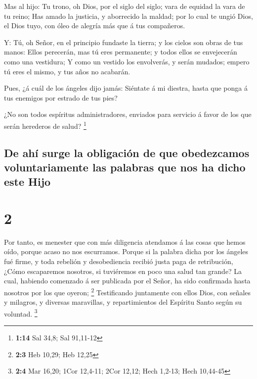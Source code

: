  Mas al hijo: Tu trono, oh Dios, por el siglo del siglo;
vara de equidad la vara de tu reino;  Has amado la
justicia, y aborrecido la maldad; por lo cual te ungió Dios, el Dios
tuyo, con óleo de alegría más que á tus compañeros.

 Y: Tú, oh Señor, en el principio fundaste la tierra; y
los cielos son obras de tus manos:  Ellos perecerán, mas
tú eres permanente; y todos ellos se envejecerán como una vestidura;
 Y como un vestido los envolverás, y serán mudados;
empero tú eres el mismo, y tus años no acabarán.

 Pues, ¿á cuál de los ángeles dijo jamás: Siéntate á mi
diestra, hasta que ponga á tus enemigos por estrado de tus pies?

 ¿No son todos espíritus administradores, enviados para
servicio á favor de los que serán herederos de salud? \footnote{\textbf{1:14}
  Sal 34,8; Sal 91,11-12}

\hypertarget{de-ahuxed-surge-la-obligaciuxf3n-de-que-obedezcamos-voluntariamente-las-palabras-que-nos-ha-dicho-este-hijo}{%
\subsection{De ahí surge la obligación de que obedezcamos
voluntariamente las palabras que nos ha dicho este
Hijo}\label{de-ahuxed-surge-la-obligaciuxf3n-de-que-obedezcamos-voluntariamente-las-palabras-que-nos-ha-dicho-este-hijo}}

\hypertarget{section-1}{%
\section{2}\label{section-1}}

 Por tanto, es menester que con más diligencia atendamos á
las cosas que hemos oído, porque acaso no nos escurramos. 
Porque si la palabra dicha por los ángeles fué firme, y toda rebelión y
desobediencia recibió justa paga de retribución,  ¿Cómo
escaparemos nosotros, si tuviéremos en poco una salud tan grande? La
cual, habiendo comenzado á ser publicada por el Señor, ha sido
confirmada hasta nosotros por los que oyeron; \footnote{\textbf{2:3} Heb
  10,29; Heb 12,25}  Testificando juntamente con ellos
Dios, con señales y milagros, y diversas maravillas, y repartimientos
del Espíritu Santo según su voluntad. \footnote{\textbf{2:4} Mar 16,20;
  1Cor 12,4-11; 2Cor 12,12; Hech 1,2-13; Hech 10,44-45}


